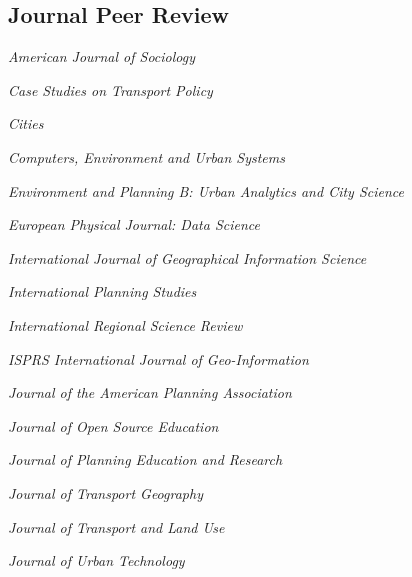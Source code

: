 \documentclass[12pt,letterpaper]{report}
\newcommand{\listitemspace}{0.15em}
\renewenvironment{itemize}
{\begin{list}{}{\setlength{\leftmargin}{0em}
            \setlength{\parskip}{0em}
            \setlength{\itemsep}{\listitemspace}
            \setlength{\parsep}{\listitemspace}}}
    {\end{list}}
\begin{document}
    \subsection*{Journal Peer Review}

    \begin{itemize}
        
        \item \textit{American Journal of Sociology}
        
        \item \textit{Case Studies on Transport Policy}

        \item \textit{Cities}

        \item \textit{Computers, Environment and Urban Systems}

        \item \textit{Environment and Planning B: Urban Analytics and City Science}

        \item \textit{European Physical Journal: Data Science}

        \item \textit{International Journal of Geographical Information Science}

        \item \textit{International Planning Studies}

        \item \textit{International Regional Science Review}

        \item \textit{ISPRS International Journal of Geo-Information}

        \item \textit{Journal of the American Planning Association}

        \item \textit{Journal of Open Source Education}
        
        \item \textit{Journal of Planning Education and Research}

        \item \textit{Journal of Transport Geography}

        \item \textit{Journal of Transport and Land Use}
        
        \item \textit{Journal of Urban Technology}


\end{itemize}
\end{document}
